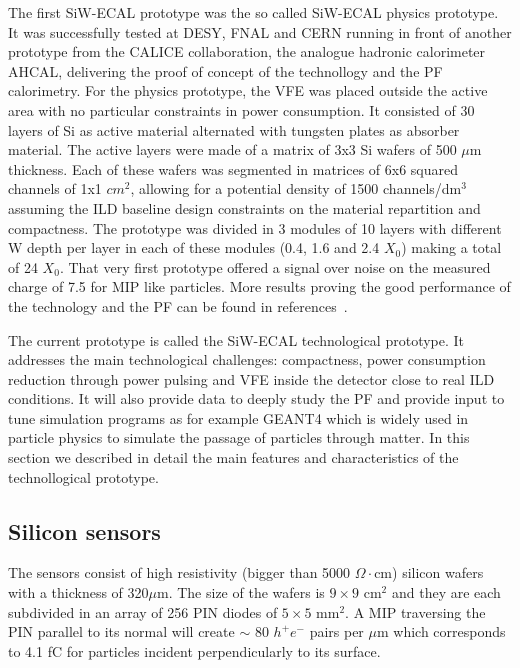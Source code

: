 \documentclass[a4paper,11pt]{article}
\begin{document}
The first SiW-ECAL prototype was the so called SiW-ECAL physics prototype.
It was successfully tested at DESY, FNAL and CERN running in front of another prototype from the CALICE
collaboration, the analogue hadronic calorimeter AHCAL, delivering the proof of concept of the technollogy
and the PF calorimetry.
For the physics prototype, the VFE was placed outside the active area with no particular constraints in power consumption.
It consisted of 30 layers of Si as active material alternated with tungsten plates as absorber material.
The active layers were made of a matrix of 3x3 Si wafers of 500 $\mu$m thickness. Each of these wafers was segmented in matrices of
6x6 squared channels of 1x1 $cm^{2}$, allowing for a potential density of 1500 channels/dm$^{3}$ assuming
the ILD baseline design constraints on the material repartition and compactness.
The prototype was divided in 3 modules of 10 layers with different W depth per layer in each of these modules
(0.4, 1.6 and 2.4 $X_{0}$) making a total of 24 $X_{0}$.
That very first prototype offered a signal over noise on the measured charge of 7.5 for MIP like 
particles. More results proving the good performance of the technology and the PF can be found in
references~\cite{Adloff:2011ha,Anduze:2008hq,Adloff:2008aa,Adloff:2010xj,CALICE:2011aa,Bilki:2014uep}.

The current prototype is called the SiW-ECAL technological prototype. It addresses the main technological challenges: compactness,
power consumption reduction through power pulsing and VFE inside the detector close to real ILD conditions.
It will also provide data to deeply study the PF and provide input to tune simulation programs as for example
GEANT4\cite{Agostinelli:2002hh,Allison:2006ve,Allison:2016lfl} which is widely used
in particle physics to simulate the passage of particles through matter. In this section we described in detail
the main features and characteristics of the technollogical prototype.

\subsection{Silicon sensors}
\label{sec:wafers}

The sensors consist of high resistivity (bigger than 5000 $\Omega\cdot$cm)
silicon wafers with a thickness of 320$\mu$m.
The size of the wafers is $9\times9$ cm$^{2}$ and they are each subdivided in an array of 256 PIN diodes of $5\times5$ mm$^{2}$.
A MIP traversing the PIN parallel to its normal will create $\sim$ 80 $h^{+}e^{-}$ pairs per $\mu$m which corresponds to 4.1 fC
for particles incident perpendicularly to its surface.
\end{document}
